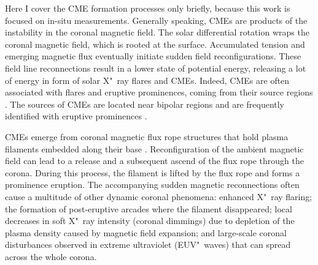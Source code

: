 Here I cover the CME formation processes only briefly, because this work is focused on in-situ measurements. Generally speaking, CMEs are products of the instability in the coronal magnetic field. The solar differential rotation wraps the coronal magnetic field, which is rooted at the surface. Accumulated tension and emerging magnetic flux eventually initiate sudden field reconfigurations. These field line reconnections result in a lower state of potential energy, releasing a lot of energy in form of solar X"~ray flares and CMEs. Indeed, CMEs are often associated with flares and eruptive prominences, coming from their source regions \citep{Webb1987}. The sources of CMEs are located near bipolar regions and are frequently identified with eruptive prominences \citep{Subramanian2001}.

CMEs emerge from coronal magnetic flux rope structures that hold plasma filaments embedded along their base \citep{Webb1987,Cremades2004}. Reconfiguration of the ambient magnetic field can lead to a release and a subsequent ascend of the flux rope through the corona. During this process, the filament is lifted by the flux rope and forms a prominence eruption. The accompanying sudden magnetic reconnections often cause a multitude of other dynamic coronal phenomena: enhanced X"~ray flaring; the formation of post-eruptive arcades where the filament disappeared; local decreases in soft X"~ray intensity (coronal dimmings) due to depletion of the plasma density caused by magnetic field expansion; and large-scale coronal disturbances observed in extreme ultraviolet (EUV"~waves) that can spread across the whole corona.

